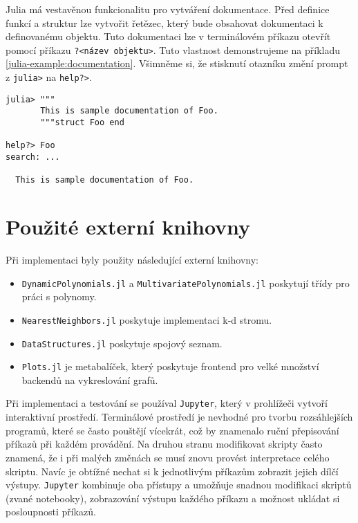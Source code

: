 Julia má vestavěnou funkcionalitu pro vytváření dokumentace. Před definice funkcí a struktur lze vytvořit řetězec, který bude obsahovat dokumentaci k definovanému objektu. Tuto dokumentaci lze v terminálovém příkazu otevřít pomocí příkazu \texttt{?<název objektu>}. Tuto vlastnost demonstrujeme na příkladu \ref{julia-example:documentation}. Všimněme si, že stisknutí otazníku změní prompt z \texttt{julia>} na \texttt{help?>}.
\begin{lstlisting}[caption={Demonstrace vestavěné dokumentace v Julii.}, label={julia-example:documentation}]
julia> """
       This is sample documentation of Foo.
       """struct Foo end

help?> Foo
search: ...

  This is sample documentation of Foo.
\end{lstlisting}

\section{Použité externí knihovny}

Při implementaci byly použity následující externí knihovny:
\begin{itemize}
  \item \texttt{DynamicPolynomials.jl}\cite{dynamic-polynomials} a \texttt{MultivariatePolynomials.jl}\cite{multivariate-polynomials} poskytují třídy pro práci s polynomy.
  \item \texttt{NearestNeighbors.jl}\cite{nearest-neighbors} poskytuje implementaci k-d stromu.
  \item \texttt{DataStructures.jl}\cite{data-structures} poskytuje spojový seznam.
  \item \texttt{Plots.jl}\cite{plots} je metabalíček, který poskytuje frontend pro velké množství backendů na vykreslování grafů.
\end{itemize}

Při implementaci a testování se používal \texttt{Jupyter}, který v prohlížeči vytvoří interaktivní prostředí. Terminálové prostředí je nevhodné pro tvorbu rozsáhlejších programů, které se často pouštějí vícekrát, což by znamenalo ruční přepisování příkazů při každém provádění. Na druhou stranu modifikovat skripty často znamená, že i při malých změnách se musí znovu provést interpretace celého skriptu. Navíc je obtížné nechat si k jednotlivým příkazům zobrazit jejich dílčí výstupy. \texttt{Jupyter} kombinuje oba přístupy a umožňuje snadnou modifikaci skriptů (zvané notebooky), zobrazování výstupu každého příkazu a možnost ukládat si posloupnosti příkazů.


